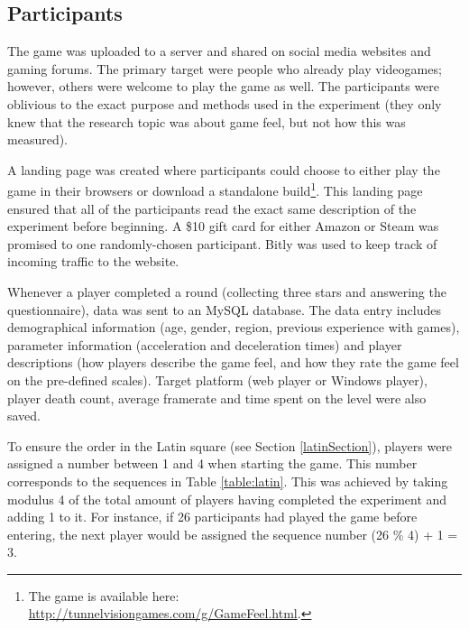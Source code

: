 \subsection{Participants}
The game was uploaded to a server and shared on social media websites and gaming forums. The primary target were people who already play videogames; however, others were welcome to play the game as well. 
The participants were oblivious to the exact purpose and methods used in the experiment (they only knew that the research topic was about game feel, but not how this was measured).

A landing page was created where participants could choose to either play the game in their browsers or download a standalone build\footnote{The game is available here: \\ \url{http://tunnelvisiongames.com/g/GameFeel.html}.}. This landing page ensured that all of the participants read the exact same description of the experiment before beginning. A \$10 gift card for either Amazon or Steam was promised to one randomly-chosen participant. Bitly \cite{bitly} was used to keep track of incoming traffic to the website.

Whenever a player completed a round (collecting three stars and answering the questionnaire), data was  sent to an MySQL database. The data entry includes demographical information (age, gender, region, previous experience with games), parameter information (acceleration and deceleration times) and player descriptions (how players describe the game feel, and how they rate the game feel on the pre-defined scales). Target platform (web player or Windows player), player death count, average framerate and time spent on the level were also saved.

To ensure the order in the Latin square (see Section \ref{latinSection}), players were assigned a number between 1 and 4 when starting the game. This number corresponds to the sequences in Table \ref{table:latin}. This was achieved by taking modulus 4 of the total amount of players having completed the experiment and adding 1 to it. For instance, if 26 participants had played the game before entering, the next player would be assigned the sequence number (26 \% 4) + 1 = 3.